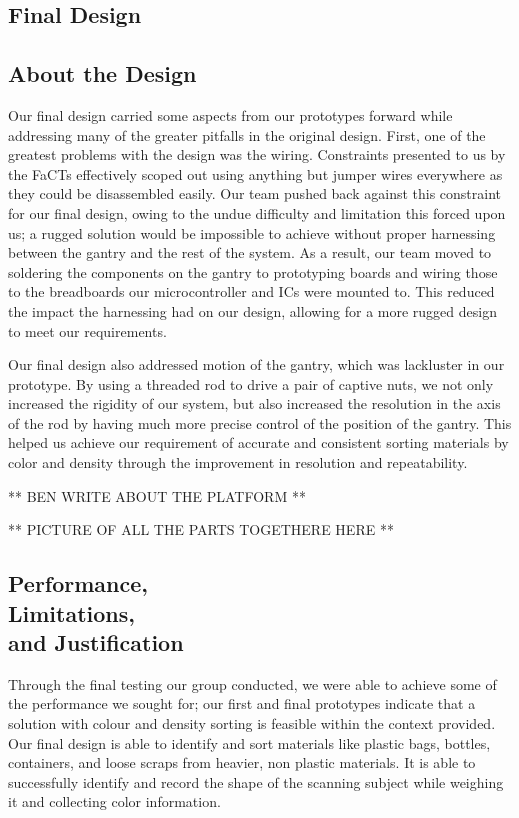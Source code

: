 \documentclass[12pt]{article}
\begin{document}
\begin{multicols*}{2}
    \section{Final Design}

        \subsection{About the Design}
            Our final design carried some aspects from our prototypes forward while addressing many of the greater pitfalls in the original design. First, one of the greatest problems with the design was the wiring. Constraints presented to us by the FaCTs effectively scoped out using anything but jumper wires everywhere as they could be disassembled easily. Our team pushed back against this constraint for our final design, owing to the undue difficulty and limitation this forced upon us; a rugged solution would be impossible to achieve without proper harnessing between the gantry and the rest of the system. As a result, our team moved to soldering the components on the gantry to prototyping boards and wiring those to the breadboards our microcontroller and ICs were mounted to. This reduced the impact the harnessing had on our design, allowing for a more rugged design to meet our requirements. 

            Our final design also addressed motion of the gantry, which was lackluster in our prototype. By using a threaded rod to drive a pair of captive nuts, we not only increased the rigidity of our system, but also increased the resolution in the axis of the rod by having much more precise control of the position of the gantry. This helped us achieve our requirement of accurate and consistent sorting materials by color and density through the improvement in resolution and repeatability.

            ** BEN WRITE ABOUT THE PLATFORM **

            ** PICTURE OF ALL THE PARTS TOGETHERE HERE **
        
            

        \subsection{Performance, \\Limitations, \\and Justification} \label{subsec:PerformanceLimitationsJustification}

            Through the final testing our group conducted, we were able to achieve some of the performance we sought for; our first and final prototypes indicate that a solution with colour and density sorting is feasible within the context provided. Our final design is able to identify and sort materials like plastic bags, bottles, containers, and loose scraps from heavier, non plastic materials. It is able to successfully identify and record the shape of the scanning subject while weighing it and collecting color information. 
            

\end{multicols*}
\end{document}
